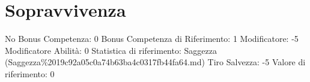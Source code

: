 \section{Sopravvivenza}\label{sopravvivenza}

\begin{description}
\tightlist
\item[Tags: ABI]
No Bonus Competenza: 0 Bonus Competenza di Riferimento: 1 Modificatore:
-5 Modificatore Abilità: 0 Statistica di riferimento: Saggezza
(Saggezza\%2019c92a05c0a74b63ba4c0317fb44fa64.md) Tiro Salvezza: -5
Valore di riferimento: 0
\end{description}
